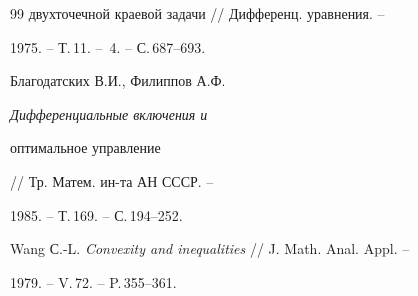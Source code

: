 \begin{thebibliography}{99}
{двухточечной краевой задачи} // Дифференц. уравнения. -- 


1975. -- Т.\,11. -- \No\,4. -- С.\,687--693. 




Благодатских В.И., Филиппов А.Ф. {\em Дифференциальные включения и 


оптимальное управление} // Тр. Матем. ин-та АН СССР. -- 


1985. -- Т.\,169. -- С.\,194--252. 




Wang С.-L. {\em Convexity and inequalities} // J. Math. Anal. Appl. -- 


1979. -- V.\,72. -- P.\,355--361. 


 


\end{thebibliography} 


 


\vskip 2cm 


 






 


\label{end} 


 


